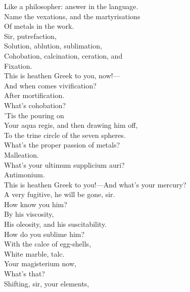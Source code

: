 \documentclass[a4paper,oneside]{memoir}
\begin{document}
\begin{drama*}
Like a philosopher: answer in the language.\\
Name the vexations, and the martyrisations\\
Of metals in the work.\\
\facespeaks {} Sir, putrefaction,\\
Solution, ablution, sublimation,\\
Cohobation, calcination, ceration, and\\
Fixation.\\
\subtlespeaks {} This is heathen Greek to you, now!---\\
And when comes vivification?\\
\facespeaks {} After mortification.\\
\subtlespeaks What's cohobation?\\
\facespeaks {} 'Tis the pouring on\\
Your aqua regis, and then drawing him off,\\
To the trine circle of the seven spheres.\\
\subtlespeaks What's the proper passion of metals?\\
\facespeaks {} Malleation.\\
\subtlespeaks What's your ultimum supplicium auri?\\
\facespeaks Antimonium.\\
\subtlespeaks {} This is heathen Greek to you!---And what's your mercury?\\
\facespeaks A very fugitive, he will be gone, sir.\\
\subtlespeaks How know you him?\\
\facespeaks {} By his viscosity,\\
His oleosity, and his suscitability.\\
\subtlespeaks How do you sublime him?\\
\facespeaks {} With the calce of egg-shells,\\
White marble, talc.\\
\subtlespeaks {} Your magisterium now,\\
What's that?\\
\facespeaks {} Shifting, sir, your elements,\\

\end{drama*}
\end{document}
